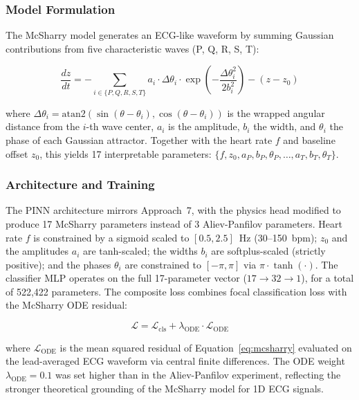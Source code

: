 \subsubsection{Model Formulation}

The McSharry model generates an ECG-like waveform by summing Gaussian contributions from five characteristic waves (P, Q, R, S, T):

\begin{equation}
    \frac{dz}{dt} = -\sum_{i \in \{P,Q,R,S,T\}} a_i \cdot \Delta\theta_i \cdot \exp\!\left(-\frac{\Delta\theta_i^2}{2b_i^2}\right) - (z - z_0)
    \label{eq:mcsharry}
\end{equation}

where $\Delta\theta_i = \text{atan2}(\sin(\theta - \theta_i), \cos(\theta - \theta_i))$ is the wrapped angular distance from the $i$-th wave center, $a_i$ is the amplitude, $b_i$ the width, and $\theta_i$ the phase of each Gaussian attractor. Together with the heart rate $f$ and baseline offset $z_0$, this yields 17 interpretable parameters: $\{f, z_0, a_P, b_P, \theta_P, \dots, a_T, b_T, \theta_T\}$.

\subsubsection{Architecture and Training}

The PINN architecture mirrors Approach~7, with the physics head modified to produce 17 McSharry parameters instead of 3 Aliev-Panfilov parameters. Heart rate $f$ is constrained by a sigmoid scaled to $[0.5, 2.5]$~Hz (30--150~bpm); $z_0$ and the amplitudes $a_i$ are tanh-scaled; the widths $b_i$ are softplus-scaled (strictly positive); and the phases $\theta_i$ are constrained to $[-\pi, \pi]$ via $\pi \cdot \tanh(\cdot)$. The classifier MLP operates on the full 17-parameter vector ($17 \to 32 \to 1$), for a total of 522,422 parameters. The composite loss combines focal classification loss with the McSharry ODE residual:

\begin{equation}
    \mathcal{L} = \mathcal{L}_{\text{cls}} + \lambda_{\text{ODE}} \cdot \mathcal{L}_{\text{ODE}}
\end{equation}

where $\mathcal{L}_{\text{ODE}}$ is the mean squared residual of Equation~\ref{eq:mcsharry} evaluated on the lead-averaged ECG waveform via central finite differences. The ODE weight $\lambda_{\text{ODE}} = 0.1$ was set higher than in the Aliev-Panfilov experiment, reflecting the stronger theoretical grounding of the McSharry model for 1D ECG signals.

